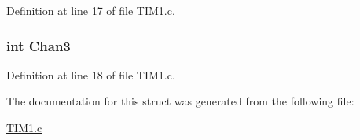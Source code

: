 Definition at line 17 of file T\+I\+M1.\+c.

\hypertarget{struct_channel_data_acea010b7f4b1b4e55de85e3a9e65e535}{}
\subsubsection[{Chan3}]{\setlength{\rightskip}{0pt plus 5cm}int Chan3}\label{struct_channel_data_acea010b7f4b1b4e55de85e3a9e65e535}


Definition at line 18 of file T\+I\+M1.\+c.



The documentation for this struct was generated from the following file\+:\begin{DoxyCompactItemize}
\item 
\hyperlink{_t_i_m1_8c}{T\+I\+M1.\+c}\end{DoxyCompactItemize}
